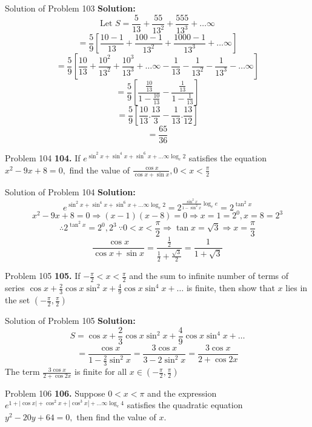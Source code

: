 \documentclass[aspectratio=1610,8pt]{beamer}
\begin{document}
\begin{frame}{Solution of Problem 103}
  \textbf{Solution:} $$\text{Let~}S = \frac{5}{13} + \frac{55}{13^2} + \frac{555}{13^3} + \ldots \infty$$
  $$= \frac{5}{9}\left[\frac{10 - 1}{13} + \frac{100 - 1}{13^2} + \frac{1000 - 1}{13^3} + \ldots \infty\right]$$
  $$= \frac{5}{9}\left[\frac{10}{13} + \frac{10^2}{13^2} + \frac{10^3}{13^3} + \ldots \infty - \frac{1}{13} - \frac{1}{13^2} -
    \frac{1}{13^3} - \ldots \infty\right]$$
  $$= \frac{5}{9}\left[\frac{\frac{10}{13}}{1 - \frac{10}{13}} - \frac{\frac{1}{13}}{1 - \frac{1}{13}}\right]$$
  $$= \frac{5}{9}\left[\frac{10}{13}.\frac{13}{3} - \frac{1}{13}.\frac{13}{12}\right]$$
  $$= \frac{65}{36}$$
\end{frame}
\begin{frame}{Problem 104}
  \textbf{104.} If $e^{{\sin^2x + \sin^4x + \sin^6x + \ldots \infty}\log_e2}$ satisfies the equation $x^2 - 9x + 8 = 0,$ find the
  value of $\frac{\cos x}{\cos x + \sin x}, 0 < x < \frac{\pi}{2}$
\end{frame}
\begin{frame}{Solution of Problem 104}
  \textbf{Solution:}$$e^{{\sin^2x + \sin^4x + \sin^6x + \ldots \infty}\log_e2} = 2^{\frac{\sin^2x}{1 - \sin^2x}\log_e e} =
  2^{\tan^2x}$$
  $$x^2 - 9x + 8 = 0 \Rightarrow (x - 1)(x - 8) = 0\Rightarrow x = 1 = 2^0, x = 8 = 2^3$$
  $$\therefore 2^{\tan^2x} = 2^0, 2^3~\because 0 < x < \frac{\pi}{2}\Rightarrow  \tan x= \sqrt{3} \Rightarrow x = \frac{\pi}{3}$$
  $$\frac{\cos x}{\cos x + \sin x} = \frac{\frac{1}{2}}{\frac{1}{2} + \frac{\sqrt{3}}{2}} = \frac{1}{1 + \sqrt{3}}$$
\end{frame}
\begin{frame}{Problem 105}
  \textbf{105.} If $-\frac{\pi}{2} < x < \frac{\pi}{2}$ and the sum to infinite number of terms of series $\cos x + \frac{2}{3}\cos
  x\sin^2x + \frac{4}{9}\cos x\sin^4x + \ldots$ is finite, then show that $x$ lies in the set $\left(-\frac{\pi}{2},
  \frac{\pi}{2}\right)$
\end{frame}
\begin{frame}{Solution of Problem 105}
  \textbf{Solution:} $$S = \cos x + \frac{2}{3}\cos x\sin^2x + \frac{4}{9}\cos x\sin^4x + \ldots$$
  $$= \frac{\cos x}{1 - \frac{2}{3}\sin^2x} = \frac{3\cos x}{3 - 2\sin^2x} = \frac{3\cos x}{2 + \cos 2x}$$
  The term $\frac{3\cos x}{2 + \cos 2x}$ is finite for all $x\in \left(-\frac{\pi}{2},\frac{\pi}{2}\right)$
\end{frame}
\begin{frame}{Problem 106}
  \textbf{106.} Suppose $0 < x < \pi$ and the expression $e^{{1 + |\cos x| + \cos^2x + |\cos^3x| + \ldots \infty}\log_e 4}$
  satisfies the quadratic equation $y^2 - 20y + 64 = 0,$ then find the value of $x.$
\end{frame}
\end{document}
